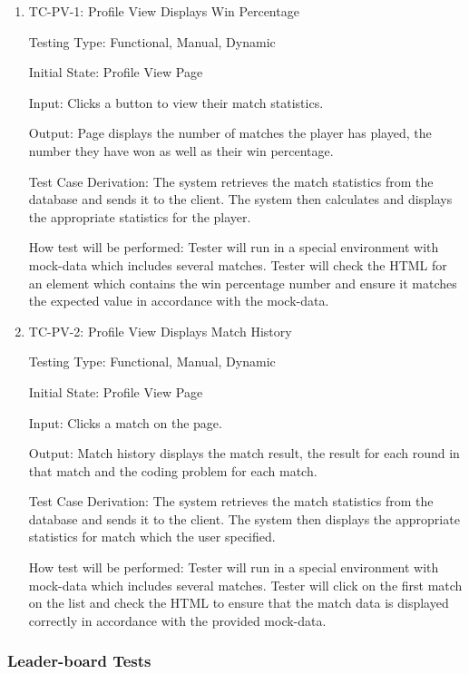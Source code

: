 \documentclass[12pt, titlepage]{article}
\begin{document}
\begin{enumerate}
\item {TC-PV-1: Profile View Displays Win Percentage}

Testing Type: Functional, Manual, Dynamic
					
Initial State: Profile View Page
					
Input: Clicks a button to view their match statistics.
					
Output: Page displays the number of matches the player has played, the number they have won as well as their win percentage.

Test Case Derivation: The system retrieves the match statistics from the database and sends it to the client. The system then calculates and displays the appropriate statistics for the player.
					
How test will be performed: Tester will run in a special environment with mock-data which includes several matches. Tester will check the HTML for an element which contains the win percentage number and ensure it matches the expected value in accordance with the mock-data.

\item {TC-PV-2: Profile View Displays Match History}

Testing Type: Functional, Manual, Dynamic
					
Initial State: Profile View Page
					
Input: Clicks a match on the page.
					
Output: Match history displays the match result, the result for each round in that match and the coding problem for each match.

Test Case Derivation: The system retrieves the match statistics from the database and sends it to the client. The system then displays the appropriate statistics for match which the user specified.
					
How test will be performed: Tester will run in a special environment with mock-data which includes several matches. Tester will click on the first match on the list and check the HTML to ensure that the match data is displayed correctly in accordance with the provided mock-data.

\end{enumerate}

\subsubsection{Leader-board Tests}
\end{document}
